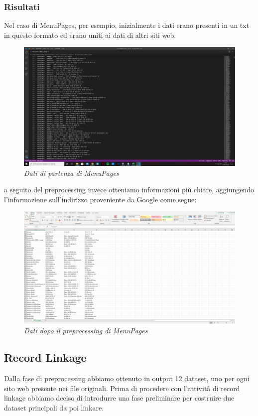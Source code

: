 \documentclass[a4paper,12pt]{article}
\begin{document}
\subsubsection{Risultati}
Nel caso di MenuPages, per esempio, inizialmente i dati erano presenti in un txt in questo formato ed erano uniti ai dati di altri siti web:\\
\begin{figure}[H]
\centering
\includegraphics[width=0.65\linewidth]{img/original.png}
\caption{\textit{Dati di partenza di MenuPages}}
\end{figure}

a seguito del preprocessing invece otteniamo informazioni più chiare, aggiungendo l'informazione sull'indirizzo proveniente da Google come segue:\\

\begin{figure}[H]
\centering
\includegraphics[width=0.65\linewidth]{img/new.png}
\caption{\textit{Dati dopo il preprocessing di MenuPages}}
\end{figure}

\newpage
\subsection{Record Linkage}
Dalla fase di preprocessing abbiamo ottenuto in output 12 dataset, uno per ogni sito web presente nei file originali. Prima di procedere con l'attività di record linkage abbiamo deciso di introdurre una fase preliminare per costruire due dataset principali da poi linkare.
\end{document}

